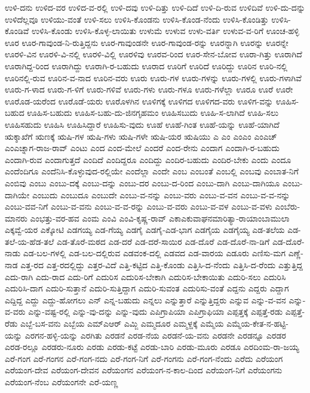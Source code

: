 {ಉಳಿ-ದನು
ಉಳಿದ-ವರ
ಉಳಿದ-ವ-ರಲ್ಲಿ
ಉಳಿ-ದವು
ಉಳಿ-ದಿತ್ತು
ಉಳಿ-ದಿದೆ
ಉಳಿ-ದಿ-ರುವ
ಉಳಿದಿವೆ
ಉಳಿ-ದು-ದನ್ನು
ಉಳಿದೆಲ್ಲವೂ
ಉಳಿಯು-ವಂತೆ
ಉಳಿ-ಸಲು
ಉಳಿಸಿ-ಕೊಂಡನು
ಉಳಿಸಿ-ಕೊಂಡ-ನೆಂದು
ಉಳಿಸಿ-ಕೊಂಡಿತ್ತು
ಉಳಿಸಿ-ಕೊಂಡಿವೆ
ಉಳಿಸಿ-ಕೊಂಡು
ಉಳಿಸಿ-ಕೊಳ್ಳ-ಲಾಯಿತು
ಉಳುಮೆ
ಉಳುವ
ಉಳು-ವರ್ತಿ
ಉಳುವ-ವ-ರಿಗೆ
ಊಂಚ-ಹಳ್ಳಿ
ಊರ
ಊರ-ಗಾವುಂಡ-ನಿ-ರುತ್ತಿದ್ದನು
ಊರ-ಗಾವುಂಡನೇ
ಊರ-ಗಾವುಂಡ-ರನ್ನು
ಊರನ್ನಾಗಿ
ಊರನ್ನು
ಊರನ್ನೇ
ಊರಳಿ-ವಿನ
ಊರಳಿ-ವಿ-ನಲ್ಲಿ
ಊರಳಿ-ವಿಲ್ಲಿ
ಊರಳಿವು
ಊರವ-ರಿಂದ
ಊರ-ಸೇನ-ಬೋವ
ಊರಾ-ಗಿತ್ತು
ಊರಾಗಿದೆ
ಊರಾಗಿದ್ದ-ರಿಂದ
ಊರಾಗಿದ್ದು
ಊರಾಗಿ-ರ-ಬಹುದು
ಊರಾದ
ಊರಿಗೆ
ಊರಿದೆ
ಊರಿದ್ದು
ಊರಿನ
ಊರಿ-ನಲ್ಲಿ
ಊರಿನಲ್ಲಿ-ರುವ
ಊರಿನ-ವ-ನಾದ
ಊರಿನ-ವರು
ಊರು
ಊರು-ಗಳ
ಊರು-ಗಳನ್ನು
ಊರು-ಗಳಲ್ಲಿ
ಊರು-ಗಳಾಗಿವೆ
ಊರು-ಗ-ಳಾದ
ಊರು-ಗ-ಳಿಗೆ
ಊರು-ಗಳಿವೆ
ಊರು-ಗಳು
ಊರು-ಗಳೂ
ಊರು-ಗಳೆಲ್ಲಾ
ಊರೂ
ಊರೆ
ಊರೇ
ಊರೊಡ-ಯರೆಂದ
ಊರೊಡೆ-ಯರು
ಊರೊಳಗಿನ
ಊಳಿಗಕ್ಕೆ
ಊಳಿಗದ
ಊಳಿಗದ-ವರು
ಊಳಿಗ-ವನ್ನು
ಊಹಿಸ-ಬಹುದ
ಊಹಿಸ-ಬಹುದು
ಊಹಿಸ-ಬಹು-ದು-ಜಿನಗೃಹಮಂ
ಊಹಿಸಬುದು
ಊಹಿ-ಸ-ಲಾಗಿದೆ
ಊಹಿ-ಸಲು
ಊಹಿಸಹುದು
ಊಹಿಸಿ
ಊಹಿಸಿದ್ದಾರೆ
ಊಹಿಸು-ವುದು
ಊಹೆ
ಊಹೆ-ಗಿಂತ
ಊಹೆ-ಯನ್ನು
ಊಹೆ-ಯಾಗಿದೆ
ಋಕ್ಶಾಖೆಗೆ
ಋಣಕ್ಕೆ
ಋಷಿ-ಗಳ
ಋಷಿ-ಗಳು
ಋಷಿ-ಗಳೇ
ಋಷಿ-ಯರ
ಋಷಿಯು
ಎ
ಎಂ
ಎಂಎಂ
ಎಂಎಚ್
ಎಂಎಚ್ನಾಗ-ರಾಜ-ರಾವ್
ಎಂಟು
ಎಂದ
ಎಂದ-ಮೇಲೆ
ಎಂದರೆ
ಎಂದ-ರೇನು
ಎಂದಾಗ
ಎಂದಾಗಿ-ರ-ಬಹುದು
ಎಂದಾಗಿ-ರುವ
ಎಂದಾಗುತ್ತದೆ
ಎಂದಿದೆ
ಎಂದಿದ್ದರೂ
ಎಂದಿದ್ದು
ಎಂದಿರ-ಬಹುದು
ಎಂದಿರ-ಬೇಕು
ಎಂದು
ಎಂದೂ
ಎಂದೆಂದಿಗೂ
ಎಂದೆನಿಸಿ-ಕೊಳ್ಳುವುದ-ರಲ್ಲಿಯೇ
ಎಂದೆಲ್ಲಾ
ಎಂದೇ
ಎಂಬ
ಎಂಬಂತೆ
ಎಂಬಲ್ಲಿ
ಎಂಬವು
ಎಂಬಾತ-ನಿಗೆ
ಎಂಬಿವು
ಎಂಬು
ಎಂಬು-ದಕ್ಕೆ
ಎಂಬು-ದನ್ನು
ಎಂಬು-ದರ
ಎಂಬು-ದ-ರಿಂದ
ಎಂಬು-ದಾಗಿ
ಎಂಬು-ದಾಗಿಯೂ
ಎಂಬು-ದಾಗಿಯೇ
ಎಂಬುದು
ಎಂಬುದೂ
ಎಂಬುದೇ
ಎಂಬು-ವ-ನನ್ನು
ಎಂಬು-ವರು
ಎಂಬು-ವ-ವನ
ಎಂಬು-ವ-ವ-ನನ್ನು
ಎಂಬು-ವವ-ನಿಗೆ
ಎಂಬು-ವ-ವನು
ಎಂಬು-ವ-ವ-ರನ್ನು
ಎಂಬು-ವ-ವರು
ಎಂಬು-ವ-ವಳ
ಎಂಬು-ವ-ವಳು
ಎಂಬೆರು-ಮಾನರು
ಎಂಭತ್ತು-ವರ-ಹವ
ಎಂಮ
ಎಂವಿ
ಎಂವಿ-ಕೃಷ್ಣ-ರಾವ್
ಎಕಾಎಕುವಾಘನಮಾರಿತ್ಯಾ-ರಾಯಾಂಬಾಮುಲಾ
ಎಕ್ಕವ್ವೆ-ಯರ
ಎಕ್ಕೋಟಿ
ಎಡಗಯ್ಯ
ಎಡ-ಗೆಯ್ಯ
ಎಡಗೈ
ಎಡಗೈ-ಎಡ-ಭಾಗ
ಎಡಗೈಯ
ಎಡಗೈಯ್ಯ
ಎಡ-ತಲೆಯ
ಎಡ-ತಲೆ-ಯ-ಹೆಡ-ತಲೆ
ಎಡ-ತೊರೆ-ಮಠದ
ಎಡ-ದರೆ
ಎಡ-ದರೆ-ಸಾಯಿರ
ಎಡ-ದೊರೆ
ಎಡ-ದೊರೆ-ನಾ-ಡಿಗೆ
ಎಡ-ದೊರೆ-ನಾಡು
ಎಡ-ಬಲ-ಗಳಲ್ಲಿ
ಎಡ-ಬಲ-ದಲ್ಲಿರುವ
ಎಡವಂಕ-ದಲ್ಲಿ
ಎಡವದ
ಎಡ-ವಾರಯ
ಎಡೂರು
ಎಣಿಸು-ಮಗ
ಎಣ್ಣೆ-ನಾಡ
ಎತ್ತ-ರದ
ಎತ್ತ-ರದಲ್ಲಿದ್ದು
ಎತ್ತರ-ವಿದೆ
ಎತ್ತಿ-ಕಟ್ಟಿದ
ಎತ್ತಿ-ಕೊಂಡು
ಎತ್ತಿಸಿ-ದ-ನೆಂದು
ಎತ್ತಿಸಿ-ದ-ರೆಂದು
ಎತ್ತುತ್ತಿದ್ದ
ಎದು-ರಾಗಿ
ಎದು-ರಾದ
ಎದು-ರಿಗೆ
ಎದುರಿಸ
ಎದುರಿಸ-ಬೇಕಾಗಿ
ಎದುರಿಸ-ಬೇಕಾಯಿತು
ಎದುರಿ-ಸಲು
ಎದುರಿಸಿ
ಎದುರಿಸಿ-ದಾಗ
ಎದುರಿ-ಸುತ್ತಾನೆ
ಎದುರಿ-ಸುತ್ತಿದ್ದಾಗ
ಎದುರಿ-ಸುವಂತ
ಎದುರಿಸು-ವಂತೆ
ಎದ್ದನು
ಎದ್ದರು
ಎದ್ದಾಗ
ಎದ್ದಿದ್ದ
ಎದ್ದು
ಎದ್ದು-ಹೋಗಲು
ಎನ್
ಎನ್ನ-ಬಹುದು
ಎನ್ನಲು
ಎನ್ನುತ್ತಾರೆ
ಎನ್ನುತ್ತಿದ್ದರು
ಎನ್ನುವ
ಎನ್ನು-ವ-ವನ
ಎನ್ನು-ವ-ವರು
ಎನ್ನು-ವಷ್ಟ-ರಲ್ಲಿ
ಎನ್ನು-ವು-ದನ್ನು
ಎನ್ನು-ವುದು
ಎಪಿಗ್ರಾಪಿಯಾ
ಎಪಿಗ್ರಾಫಿಯಾ
ಎಪ್ಪತ್ತಕ್ಕೆ
ಎಪ್ಪತ್ತೆ-ರಡು
ಎಪ್ಪತ್ತೆ-ರೆಡು
ಎಬ್ಬೆ-ಬಸ-ವನು
ಎಬ್ಬೆಯ
ಎಮ್ಎಆರ್
ಎಮ್ಜಿ
ಎಮ್ಮದೂರ
ಎಮ್ಮಳ್ದಕ್ಕೆ
ಎಮ್ಮೆಯ
ಎಮ್ಮೆಯ-ಕೇತ-ನ-ಹಟ್ಟಿ-ಯನ್ನು
ಎರಗನ-ಹಳ್ಳಿ-ಯನ್ನು
ಎರಗಿತು
ಎರಡನೆ
ಎರಡ-ನೆಯ
ಎರಡನೆ-ಯ-ವನು
ಎರಡನೇ
ಎರಡನ್ನೂ
ಎರಡರ
ಎರಡ-ರಲ್ಲೂ
ಎರಡರು-ನೂರು
ಎರಡು
ಎರಡು-ಕಟ್ಟೆ
ಎರಡು-ಬಾರಿ
ಎರಡು-ಮೂರು
ಎರಡೂ
ಎರದಿಂಮ-ರಾ-ಜಯ್ಯ
ಎರೆ-ಗಂಗ
ಎರೆ-ಗಂಗನ
ಎರೆ-ಗಂಗ-ನದು
ಎರೆ-ಗಂಗ-ನಿಗೆ
ಎರೆ-ಗಂಗನು
ಎರೆ-ಗಂಗ-ನೆಂದು
ಎರೆದು
ಎರೆಯಂಗ
ಎರೆಯಂಗ-ದೇವ
ಎರೆಯಂಗ-ದೇವನ
ಎರೆಯಂಗನ
ಎರೆಯಂಗ-ನ-ಕಾಲ-ದಿಂದ
ಎರೆಯಂಗ-ನಿಗೆ
ಎರೆಯಂಗನು
ಎರೆಯಂಗ-ನೆಂಬ
ಎರೆಯಂಗನೇ
ಎರೆ-ಯಣ್ಣ
}
